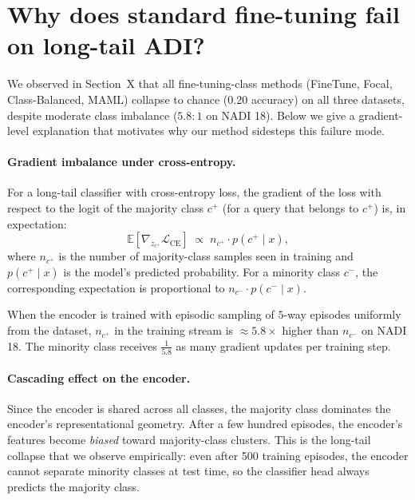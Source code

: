 
\section{Why does standard fine-tuning fail on long-tail ADI?}
\label{sec:theory}

We observed in Section~X that all fine-tuning-class methods
(FineTune, Focal, Class-Balanced, MAML) collapse to chance
($0.20$ accuracy) on all three datasets, despite moderate
class imbalance ($5.8{:}1$ on NADI 18). Below we give a
gradient-level explanation that motivates why our method
sidesteps this failure mode.

\paragraph{Gradient imbalance under cross-entropy.}
For a long-tail classifier with cross-entropy loss, the gradient
of the loss with respect to the logit of the majority class
$c^+$ (for a query that belongs to $c^+$) is, in expectation:
\begin{equation}
\mathbb{E}[\nabla_{z_{c^+}} \mathcal{L}_{\text{CE}}] \;\propto\; n_{c^+} \cdot p(c^+ \mid x),
\end{equation}
where $n_{c^+}$ is the number of majority-class samples seen in
training and $p(c^+ \mid x)$ is the model's predicted probability.
For a minority class $c^-$, the corresponding expectation is
proportional to $n_{c^-} \cdot p(c^- \mid x)$.

When the encoder is trained with episodic sampling of $5$-way
episodes uniformly from the dataset, $n_{c^+}$ in the training
stream is $\approx 5.8\times$ higher than $n_{c^-}$ on NADI 18.
The minority class receives $\frac{1}{5.8}$ as many gradient
updates per training step.

\paragraph{Cascading effect on the encoder.}
Since the encoder is shared across all classes, the majority class
dominates the encoder's representational geometry. After a few
hundred episodes, the encoder's features become \emph{biased}
toward majority-class clusters. This is the long-tail collapse
that we observe empirically: even after 500 training episodes,
the encoder cannot separate minority classes at test time, so
the classifier head always predicts the majority class.

